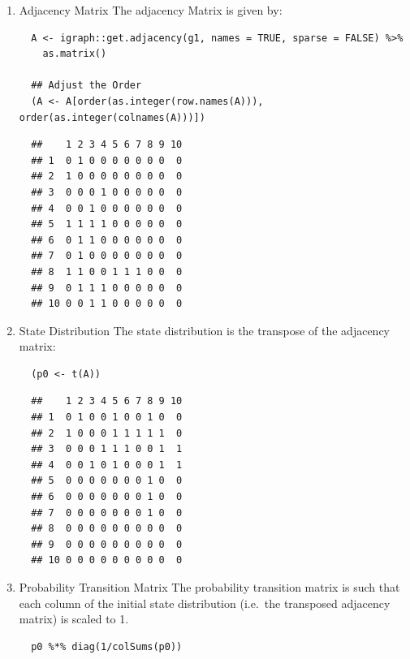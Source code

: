 \documentclass[11pt]{article}
\begin{document}
\begin{enumerate}
\item Adjacency Matrix
\label{adjacency-matrix}
The adjacency Matrix is given by:

\lstset{language=r,label= ,caption= ,captionpos=b,numbers=none}
\begin{lstlisting}
  A <- igraph::get.adjacency(g1, names = TRUE, sparse = FALSE) %>%
    as.matrix()

  ## Adjust the Order
  (A <- A[order(as.integer(row.names(A))), order(as.integer(colnames(A)))])
\end{lstlisting}

\begin{verbatim}
  ##    1 2 3 4 5 6 7 8 9 10
  ## 1  0 1 0 0 0 0 0 0 0  0
  ## 2  1 0 0 0 0 0 0 0 0  0
  ## 3  0 0 0 1 0 0 0 0 0  0
  ## 4  0 0 1 0 0 0 0 0 0  0
  ## 5  1 1 1 1 0 0 0 0 0  0
  ## 6  0 1 1 0 0 0 0 0 0  0
  ## 7  0 1 0 0 0 0 0 0 0  0
  ## 8  1 1 0 0 1 1 1 0 0  0
  ## 9  0 1 1 1 0 0 0 0 0  0
  ## 10 0 0 1 1 0 0 0 0 0  0
\end{verbatim}

\item State Distribution
\label{state-distribution}
The state distribution is the transpose of the adjacency matrix:

\lstset{language=r,label= ,caption= ,captionpos=b,numbers=none}
\begin{lstlisting}
  (p0 <- t(A))
\end{lstlisting}

\begin{verbatim}
  ##    1 2 3 4 5 6 7 8 9 10
  ## 1  0 1 0 0 1 0 0 1 0  0
  ## 2  1 0 0 0 1 1 1 1 1  0
  ## 3  0 0 0 1 1 1 0 0 1  1
  ## 4  0 0 1 0 1 0 0 0 1  1
  ## 5  0 0 0 0 0 0 0 1 0  0
  ## 6  0 0 0 0 0 0 0 1 0  0
  ## 7  0 0 0 0 0 0 0 1 0  0
  ## 8  0 0 0 0 0 0 0 0 0  0
  ## 9  0 0 0 0 0 0 0 0 0  0
  ## 10 0 0 0 0 0 0 0 0 0  0
\end{verbatim}

\item Probability Transition Matrix
\label{probability-transition-matrix}
The probability transition matrix is such that each column of the
initial state distribution (i.e. the transposed adjacency matrix) is
scaled to 1.

\lstset{language=r,label= ,caption= ,captionpos=b,numbers=none}
\begin{lstlisting}
  p0 %*% diag(1/colSums(p0))
\end{lstlisting}


\end{enumerate}
\end{document}
